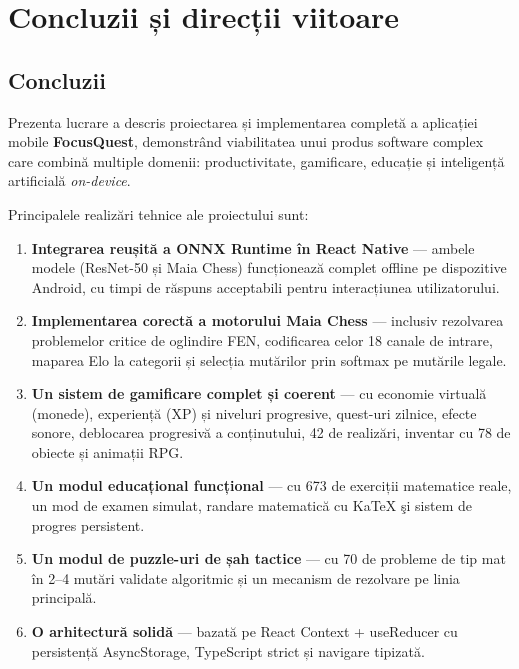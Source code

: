 \documentclass[12pt, a4paper, twoside]{report}
\numberwithin{equation}{section}
\begin{document}
\chapter{Concluzii și direcții viitoare}

\section{Concluzii}

Prezenta lucrare a descris proiectarea și implementarea completă a aplicației mobile
\textbf{FocusQuest}, demonstrând viabilitatea unui produs software complex care combină
multiple domenii: productivitate, gamificare, educație și inteligență artificială
\textit{on-device}.

Principalele realizări tehnice ale proiectului sunt:

\begin{enumerate}
  \item \textbf{Integrarea reușită a ONNX Runtime în React Native} — ambele modele
    (ResNet-50 și Maia Chess) funcționează complet offline pe dispozitive Android,
    cu timpi de răspuns acceptabili pentru interacțiunea utilizatorului.

  \item \textbf{Implementarea corectă a motorului Maia Chess} — inclusiv rezolvarea
    problemelor critice de oglindire FEN, codificarea celor 18 canale de intrare,
    maparea Elo la categorii și selecția mutărilor prin softmax pe mutările legale.

  \item \textbf{Un sistem de gamificare complet și coerent} — cu economie virtuală
    (monede), experiență (XP) și niveluri progresive, quest-uri zilnice, efecte sonore,
    deblocarea progresivă a conținutului, 42 de realizări, inventar cu 78 de
    obiecte și animații RPG.

  \item \textbf{Un modul educațional funcțional} — cu 673 de exerciții matematice reale,
    un mod de examen simulat, randare matematică cu KaTeX şi sistem de progres persistent.

  \item \textbf{Un modul de puzzle-uri de șah tactice} — cu 70 de probleme de tip mat în
    2--4 mutări validate algoritmic și un mecanism de rezolvare pe linia principală.

  \item \textbf{O arhitectură solidă} — bazată pe React Context + useReducer cu
    persistență AsyncStorage, TypeScript strict și navigare tipizată.
\end{enumerate}
\end{document}
